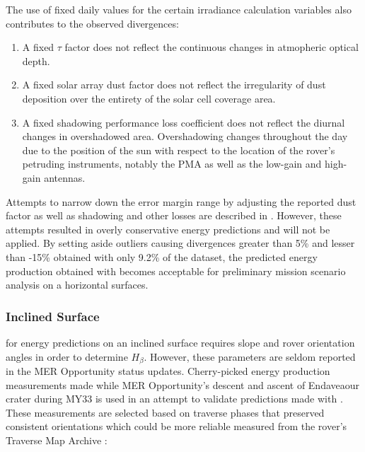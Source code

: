 The use of fixed daily values for the certain irradiance calculation variables also contributes to the observed divergences:

\begin{enumerate}[label=\textbf{\textcolor{BulletBlue}{(\alph*)}}]
  \item A fixed $\tau$ factor does not reflect the continuous changes in atmopheric optical depth.
  \item A fixed solar array dust factor does not reflect the irregularity of dust deposition over the entirety of the solar cell coverage area.
  \item A fixed shadowing performance loss coefficient does not reflect the diurnal changes in overshadowed area. Overshadowing changes throughout the day due to the position of the sun with respect to the location of the rover's petruding instruments, notably the \ac{PMA} as well as the low-gain and high-gain antennas.
\end{enumerate}

Attempts to narrow down the error margin range by adjusting the reported dust factor as well as shadowing and other losses are described in . However, these attempts resulted in overly conservative energy predictions and will not be applied. By setting aside outliers causing divergences greater than 5\% and lesser than -15\% obtained with only 9.2\% of the dataset, the predicted energy production obtained with  becomes acceptable for preliminary mission scenario analysis on a horizontal surfaces.

\subsubsection{Inclined Surface}
\label{sec:PowerAndEnergyPredictions:Validation:InclinedSurface}

 for energy predictions on an inclined surface requires slope and rover orientation angles in order to determine $H_{\beta}$. However, these parameters are seldom reported in the \ac{MER} Opportunity status updates. Cherry-picked energy production measurements made while \ac{MER} Opportunity's descent and ascent of Endaveaour crater during MY33 is used in an attempt to validate predictions made with . These measurements are selected based on traverse phases that preserved consistent orientations which could be more reliable measured from the rover's Traverse Map Archive :

